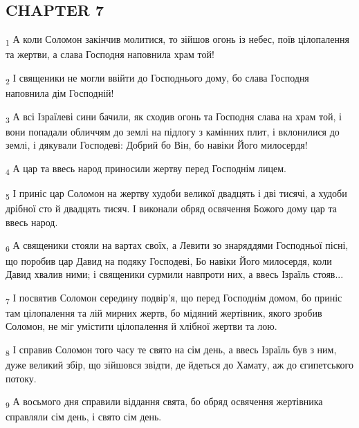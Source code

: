 \subsection{CHAPTER 7}
\begin{tcolorbox}
\textsubscript{1} А коли Соломон закінчив молитися, то зійшов огонь із небес, поїв цілопалення та жертви, а слава Господня наповнила храм той!
\end{tcolorbox}
\begin{tcolorbox}
\textsubscript{2} І священики не могли ввійти до Господнього дому, бо слава Господня наповнила дім Господній!
\end{tcolorbox}
\begin{tcolorbox}
\textsubscript{3} А всі Ізраїлеві сини бачили, як сходив огонь та Господня слава на храм той, і вони попадали обличчям до землі на підлогу з камінних плит, і вклонилися до землі, і дякували Господеві: Добрий бо Він, бо навіки Його милосердя!
\end{tcolorbox}
\begin{tcolorbox}
\textsubscript{4} А цар та ввесь народ приносили жертву перед Господнім лицем.
\end{tcolorbox}
\begin{tcolorbox}
\textsubscript{5} І приніс цар Соломон на жертву худоби великої двадцять і дві тисячі, а худоби дрібної сто й двадцять тисяч. І виконали обряд освячення Божого дому цар та ввесь народ.
\end{tcolorbox}
\begin{tcolorbox}
\textsubscript{6} А священики стояли на вартах своїх, а Левити зо знаряддями Господньої пісні, що поробив цар Давид на подяку Господеві, Бо навіки Його милосердя, коли Давид хвалив ними; і священики сурмили навпроти них, а ввесь Ізраїль стояв...
\end{tcolorbox}
\begin{tcolorbox}
\textsubscript{7} І посвятив Соломон середину подвір'я, що перед Господнім домом, бо приніс там цілопалення та лій мирних жертв, бо мідяний жертівник, якого зробив Соломон, не міг умістити цілопалення й хлібної жертви та лою.
\end{tcolorbox}
\begin{tcolorbox}
\textsubscript{8} І справив Соломон того часу те свято на сім день, а ввесь Ізраїль був з ним, дуже великий збір, що зійшовся звідти, де йдеться до Хамату, аж до єгипетського потоку.
\end{tcolorbox}
\begin{tcolorbox}
\textsubscript{9} А восьмого дня справили віддання свята, бо обряд освячення жертівника справляли сім день, і свято сім день.
\end{tcolorbox}
